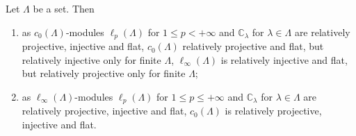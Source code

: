 \begin{proposition}\label{c0AndlInftyModsRelTh} Let $\Lambda$ be a set. Then

\begin{enumerate}[label = (\roman*)]
    \item as $c_0(\Lambda)$-modules $\ell_p(\Lambda)$ for $1\leq p<+\infty$ and
    $\mathbb{C}_\lambda$ for $\lambda\in\Lambda$ are relatively projective,
    injective and flat, $c_0(\Lambda)$ relatively projective and flat, but
    relatively injective only for finite $\Lambda$, $\ell_\infty(\Lambda)$ is
    relatively injective and flat, but relatively projective only for finite
    $\Lambda$;

    \item as $\ell_\infty(\Lambda)$-modules $\ell_p(\Lambda)$ for 
    $1\leq p\leq+\infty$ and $\mathbb{C}_\lambda$ for $\lambda\in\Lambda$ 
    are relatively projective, injective and flat, $c_0(\Lambda)$ is 
    relatively projective, injective and flat.
\end{enumerate}
\end{proposition}
